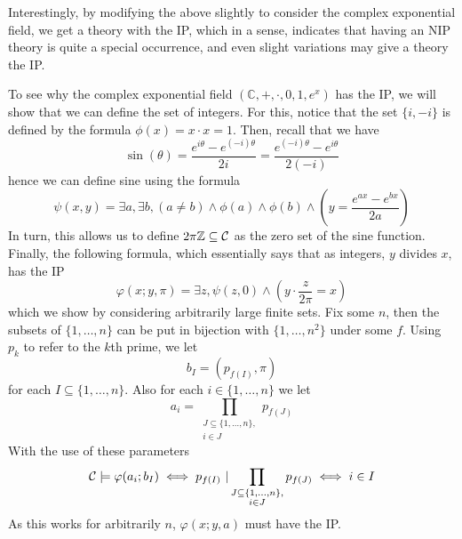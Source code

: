 Interestingly, by modifying the above slightly to consider the complex exponential field, we get a
theory with the IP, which in a sense, indicates that having an NIP theory is quite a special
occurrence, and even slight variations may give a theory the IP.

\begin{exmp}
  To see why the complex exponential field $(\mathbb{C},+,\cdot,0,1,e^x)$ has the IP, we will show
  that we can define the set of integers. For this, notice that the set $\{i,-i\}$ is defined by
  the formula $\phi(x) = x \cdot x = 1$. Then, recall that we have
  \begin{equation*}
    \sin(\theta) = \frac{e^{i\theta} - e^{(-i)\theta}}{2i}
                 = \frac{e^{(-i)\theta} - e^{i\theta}}{2(-i)}
  \end{equation*}
  hence we can define sine using the formula
  \begin{equation*}
    \psi(x,y) = \exists a, \exists b, (a \neq b) \land \phi(a) \land \phi(b) \land
      \left(y = \frac{e^{ax} - e^{bx}}{2a}\right)
  \end{equation*}
  In turn, this allows us to define $2\pi \mathbb{Z} \subseteq \mathbb{\mathcal{C}}$ as the zero set of the sine
  function. Finally, the following formula, which essentially says that as integers, $y$ divides
  $x$, has the IP
  \begin{equation*}
    \varphi(x;y,\pi) = \exists z, \psi(z,0) \land \left(y \cdot \frac{z}{2\pi} = x\right)
  \end{equation*}
  which we show by considering arbitrarily large finite sets. Fix some $n$, then the subsets of
  $\{1,\dots,n\}$ can be put in bijection with $\{1,\dots,n^2\}$ under some $f$. Using $p_k$
  to refer to the $k$th prime, we let
  \begin{equation*}
    b_I = (p_{f(I)}, \pi)
  \end{equation*}
  for each $I \subseteq \{1,\dots,n\}$. Also for each $i \in \{1,\dots,n\}$ we let
  \begin{equation*}
    a_i = \prod_{\substack{J \subseteq \{1,\dots,n\},\\ i \in J}} p_{f(J)}
  \end{equation*}
  With the use of these parameters
  \begin{equation*}
    \mathcal{C} \models \varphi(a_i;b_I)
      \iff p_{f(I)}\ | \prod_{\substack{J \subseteq \{1,\dots,n\},\\ i \in J}} p_{f(J)}
      \iff i \in I
  \end{equation*}
  As this works for arbitrarily $n$, $\varphi(x;y,a)$ must have the IP.
\end{exmp}